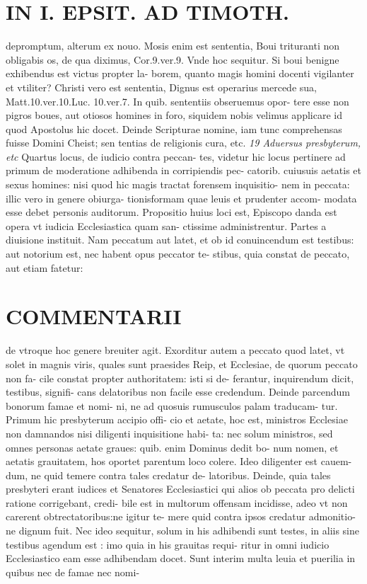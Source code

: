 \documentclass{article}
\begin{document}
\begin{pages}
\section*{IN I. EPSIT. AD TIMOTH. }
\marginpar{[ p.133 ]}\pstart depromptum, alterum ex nouo. Mosis enim est sententia, Boui trituranti non obligabis os, de qua diximus, Cor.9.ver.9. Vnde hoc sequitur. Si boui benigne exhibendus est victus propter la- borem, quanto magis homini docenti vigilanter et vtiliter? Christi vero est sententia, Dignus est operarius mercede sua, Matt.10.ver.10.Luc. 10.ver.7. In quib. sententiis obseruemus opor- tere esse non pigros boues, aut otiosos homines in foro, siquidem nobis velimus applicare id quod Apostolus hic docet. Deinde Scripturae nomine, iam tunc comprehensas fuisse Domini Cheist; sen tentias de religionis cura, etc.  \pend
\textit{19 Aduersus presbyterum, etc }\pstart Quartus locus, de iudicio contra peccan- tes, videtur hic locus pertinere ad primum de moderatione adhibenda in corripiendis pec- catorib. cuiusuis aetatis et sexus homines: nisi quod hic magis tractat forensem inquisitio- nem in peccata: illic vero in genere obiurga- tionisformam quae leuis et prudenter accom- modata esse debet personis auditorum.  \pend\pstart Propositio huius loci est, Episcopo danda est opera vt iudicia Ecclesiastica quam san- ctissime administrentur.  \pend\pstart Partes a diuisione instituit. Nam peccatum aut latet, et ob id conuincendum est testibus: aut notorium est, nec habent opus peccator te- stibus, quia constat de peccato, aut etiam fatetur:  \pend
\marginpar{[ p.134 ]}
\section*{COMMENTARII }\pstart de vtroque hoc genere breuiter agit.  \pend\pstart Exorditur autem a peccato quod latet, vt solet in magnis viris, quales sunt praesides Reip, et Ecclesiae, de quorum peccato non fa- cile constat propter authoritatem: isti si de- ferantur, inquirendum dicit, testibus, signifi- cans delatoribus non facile esse credendum. Deinde parcendum bonorum famae et nomi- ni, ne ad quosuis rumusculos palam traducam- tur. Primum hic presbyterum accipio offi- cio et aetate, hoc est, ministros Ecclesiae non damnandos nisi diligenti inquisitione habi- ta: nec solum ministros, sed omnes personas aetate graues: quib. enim Dominus dedit bo- num nomen, et aetatis grauitatem, hos oportet parentum loco colere. Ideo diligenter est cauem- dum, ne quid temere contra tales credatur de- latoribus. Deinde, quia tales presbyteri erant iudices et Senatores Ecclesiastici qui alios ob peccata pro delicti ratione corrigebant, credi- bile est in multorum offensam incidisse, adeo vt non carerent obtrectatoribus:ne igitur te- mere quid contra ipsos credatur admonitio- ne dignum fuit. Nec ideo sequitur, solum in his adhibendi sunt testes, in aliis sine testibus agendum est : imo quia in his grauitas requi- ritur in omni iudicio Ecclesiastico eam esse adhibendam docet. Sunt interim multa leuia et puerilia in quibus nec de famae nec nomi-  \pend

\end{pages}
\end{document}
